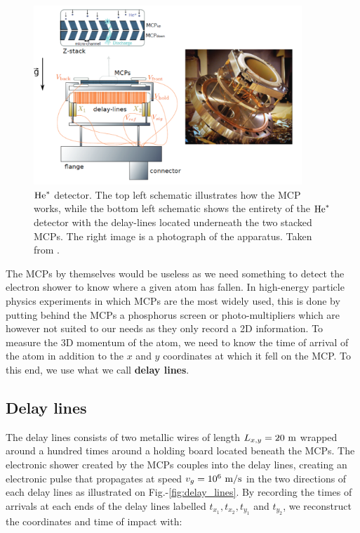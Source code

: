 \begin{figure}
    \centering
    \includegraphics[width=0.9\textwidth]{Fig/Chapter3/MCP.png}
    \caption[$\He$ detector]{$\He$ detector. The top left schematic illustrates how the MCP works, while the bottom left schematic shows the entirety of the $\He$ detector with the delay-lines located underneath the two stacked MCPs. The right image is a photograph of the apparatus. Taken from \cite{cayla_these}.}
    \label{fig:MCP}
\end{figure}



The MCPs by themselves would be useless as we need something to detect the electron shower to know where a given atom has fallen. In high-energy particle physics experiments in which MCPs are the most widely used, this is done by putting behind the MCPs a phosphorus screen or photo-multipliers which are however not suited to our needs as they only record a 2D information. To measure the 3D momentum of the atom, we need to know the time of arrival of the atom in addition to the $x$ and $y$ coordinates at which it fell on the MCP. To this end, we use what we call \textbf{delay lines}.

\subsection{Delay lines}

\label{sec:delay_lines}

The delay lines consists of two metallic wires of length $L_{x,y}=20 \ \rm{m}$ wrapped around a hundred times around a holding board located beneath the MCPs. The electronic shower created by the MCPs couples into the delay lines, creating an electronic pulse that propagates at speed $v_g=10^6 \ \rm{m/s}$ in the two directions of each delay lines as illustrated on Fig.-\ref{fig:delay_lines}. By recording the times of arrivals at each ends of the delay lines labelled $t_{x_1},t_{x_2},t_{y_1}$ and $t_{y_2}$, we reconstruct the coordinates and time of impact with:


